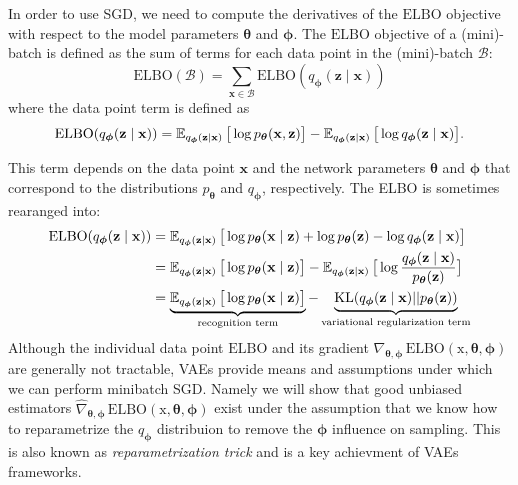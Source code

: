 In order to use SGD, we need to compute the derivatives of the $\mathrm{ELBO}$ objective with respect to the model parameters ${\boldsymbol{\theta}}$ and ${\boldsymbol{\phi}}$. 
The $\mathrm{ELBO}$ objective of a (mini)-batch is defined as the sum of terms for each data point in the (mini)-batch $\mathcal{B}$:
$$
\mathrm{ELBO}(\mathcal{B}) = \sum_{\mathbf{x} \in \mathcal{B}} \mathrm{ELBO}(q_{\boldsymbol{\phi}}(\mathbf{z}\mid \mathbf{x}))
$$
where the data point term is defined as
$$
\mathrm{ELBO}(q_{\boldsymbol{\phi}}(\mathbf{z}\mid \mathbf{x})) = \operatorname{\mathbb{E}}_{q_{\boldsymbol{\phi}}(\mathbf{z}\mid \mathbf{x})} \big[\log p_{\boldsymbol{\theta}}(\mathbf{x},\mathbf{z})\big] - \operatorname{\mathbb{E}}_{q_{\boldsymbol{\phi}}(\mathbf{z}\mid \mathbf{x})} \big[\log q_{\boldsymbol{\phi}}(\mathbf{z}\mid \mathbf{x})\big].
$$

This term depends on the data point $\mathbf{x}$ and the network parameters ${\boldsymbol{\theta}}$ and ${\boldsymbol{\phi}}$ that correspond to the distributions $p_{\boldsymbol{\theta}}$ and $q_{\boldsymbol{\phi}}$, respectively.
The ELBO is sometimes rearanged into:
\begin{align}
    \mathrm{ELBO}(q_{\boldsymbol{\phi}}(\mathbf{z}\mid \mathbf{x})) &= \operatorname{\mathbb{E}}_{q_{\boldsymbol{\phi}}(\mathbf{z}\mid \mathbf{x})} \big[\log p_{\boldsymbol{\theta}}(\mathbf{x}\mid \mathbf{z}) + \log p_{\boldsymbol{\theta}}(\mathbf{z}) - \log q_{\boldsymbol{\phi}}(\mathbf{z}\mid\mathbf{x})\big] \notag\\
    &= \operatorname{\mathbb{E}}_{q_{\boldsymbol{\phi}}(\mathbf{z}\mid\mathbf{x})} \big[\log p_{\boldsymbol{\theta}}(\mathbf{x}\mid\mathbf{z}) \big] - \operatorname{\mathbb{E}}_{q_{\boldsymbol{\phi}}(\mathbf{z}\mid\mathbf{x})} \big[  \log \frac{q_{\boldsymbol{\phi}}(\mathbf{z}\mid\mathbf{x})}{p_{\boldsymbol{\theta}}(\mathbf{z})} \big] \notag\\
    &= \underbrace{\operatorname{\mathbb{E}}_{q_{\boldsymbol{\phi}}(\mathbf{z}\mid\mathbf{x})} \big[\log p_{\boldsymbol{\theta}}(\mathbf{x}\mid\mathbf{z}) \big]}_{\text{recognition term}} - \underbrace{\mathrm{KL}(q_{\boldsymbol{\phi}}(\mathbf{z}\mid\mathbf{x}) ||p_{\boldsymbol{\theta}}(\mathbf{z}))}_{\text{variational regularization term}} \label{eq:elbo_terms}
\end{align}
Although the individual data point $\mathrm{ELBO}$ and its gradient $\nabla_{{\boldsymbol{\theta}},{\boldsymbol{\phi}}}\,\mathrm{ELBO}(\mathrm{x},{\boldsymbol{\theta}},{\boldsymbol{\phi}})$ are generally not tractable, VAEs provide
means and assumptions under which we can perform minibatch SGD. Namely we will show that good unbiased estimators $\hat{\nabla}_{{\boldsymbol{\theta}},{\boldsymbol{\phi}}}\,\mathrm{ELBO}(\mathrm{x},{\boldsymbol{\theta}},{\boldsymbol{\phi}})$ 
exist under the assumption that we know how to reparametrize the $q_{\boldsymbol{\phi}}$ distribuion to remove the ${\boldsymbol{\phi}}$ influence on sampling. This is also known as \textit{reparametrization trick}
and is a key achievment of VAEs frameworks. 

